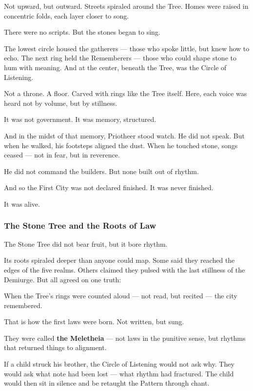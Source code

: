 \documentclass[12pt]{article}
\begin{document}
Not upward, but outward.  
Streets spiraled around the Tree.  
Homes were raised in concentric folds, each layer closer to song.

There were no scripts.  
But the stones began to sing.

The lowest circle housed the gatherers — those who spoke little, but knew how to echo.  
The next ring held the Rememberers — those who could shape stone to hum with meaning.  
And at the center, beneath the Tree, was the Circle of Listening.

Not a throne.  
A floor.  
Carved with rings like the Tree itself.  
Here, each voice was heard not by volume, but by stillness.

It was not government.  
It was memory, structured.

And in the midst of that memory, Priotheer stood watch.  
He did not speak.  
But when he walked, his footsteps aligned the dust.  
When he touched stone, songs ceased — not in fear, but in reverence.

He did not command the builders.  
But none built out of rhythm.

And so the First City was not declared finished.  
It was never finished.

It was alive.

\dotfill

\subsubsection*{The Stone Tree and the Roots of Law}

The Stone Tree did not bear fruit, but it bore rhythm.

Its roots spiraled deeper than anyone could map.  
Some said they reached the edges of the five realms.  
Others claimed they pulsed with the last stillness of the Demiurge.  
But all agreed on one truth:

When the Tree’s rings were counted aloud — not read, but recited —  
the city remembered.

That is how the first laws were born.  
Not written, but sung.

They were called \textbf{the Meletheia} — not laws in the punitive sense,  
but rhythms that returned things to alignment.

If a child struck his brother, the Circle of Listening would not ask why.  
They would ask what note had been lost — what rhythm had fractured.  
The child would then sit in silence and be retaught the Pattern through chant.
\end{document}
